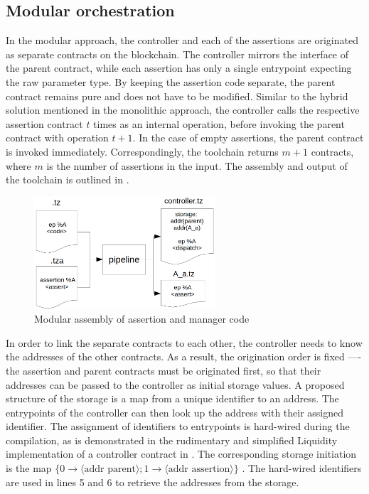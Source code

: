 \subsection{Modular orchestration}\label{sec:modular}
In the modular approach, the controller and each of the assertions are originated as separate contracts on the blockchain. The controller mirrors the interface of the parent contract, while each assertion has only a single entrypoint expecting the raw parameter type. By keeping the assertion code separate, the parent contract remains pure and does not have to be modified. Similar to the hybrid solution mentioned in the monolithic approach, the controller calls the respective assertion contract $t$ times as an internal operation, before invoking the parent contract with operation $t+1$. In the case of empty assertions, the parent contract is invoked immediately. Correspondingly, the toolchain returns $m + 1$ contracts, where $m$ is the number of assertions in the input. The assembly and output of the toolchain is outlined in .
\begin{figure}[h]
\centering
  \includegraphics[width=0.6\textwidth]{figures/5-offline_tezos/pipeline_output_modular.png}
	\caption{Modular assembly of assertion and manager code}
	\label{fig:modular_assembly}
\end{figure}

In order to link the separate contracts to each other, the controller needs to know the addresses of the other contracts. As a result, the origination order is fixed ---- the assertion and parent contracts must be originated first, so that their addresses can be passed to the controller as initial storage values. A proposed structure of the storage is a map from a unique identifier to an address. The entrypoints of the controller can then look up the address with their assigned identifier. The assignment of identifiers to entrypoints is hard-wired during the compilation, as is demonstrated in the rudimentary and simplified Liquidity implementation of a controller contract in . The corresponding storage initiation is the map $\lbrace 0 \rightarrow \langle \text{addr parent} \rangle; 1 \rightarrow \langle \text{addr assertion} \rangle \rbrace$ . The hard-wired identifiers are used in lines 5 and 6 to retrieve the addresses from the storage.


